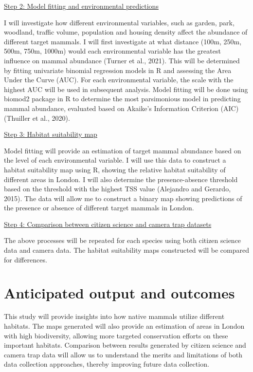 \documentclass[11pt, a4paper]{article}
\begin{document}
\underline{Step 2: Model fitting and environmental predictions}

I will investigate how different environmental variables, such as garden, park, woodland, traffic volume, population and housing density affect the abundance of different target mammals. I will first investigate at what distance (100m, 250m, 500m, 750m, 1000m) would each environmental variable has the greatest influence on mammal abundance (Turner et al., 2021). This will be determined by fitting univariate binomial regression models in R and assessing the Area Under the Curve (AUC). For each environmental variable, the scale with the highest AUC will be used in subsequent analysis. Model fitting will be done using biomod2 package in R to determine the most parsimonious model in predicting mammal abundance, evaluated based on Akaike’s Information Criterion (AIC) (Thuiller et al., 2020). 
\vspace{\baselineskip}

\underline{Step 3: Habitat suitability map} 

Model fitting will provide an estimation of target mammal abundance based on the level of each environmental variable. I will use this data to construct a habitat suitability map using R, showing the relative habitat suitability of different areas in London. I will also determine the presence-absence threshold based on the threshold with the highest TSS value (Alejandro and Gerardo, 2015). The data will allow me to construct a binary map showing predictions of the presence or absence of different target mammals in London. 
\vspace{\baselineskip}

\underline{Step 4: Comparison between citizen science and camera trap datasets} 

The above processes will be repeated for each species using both citizen science data and camera data. The habitat suitability maps constructed will be compared for differences. 

\section{Anticipated output and outcomes}

This study will provide insights into how native mammals utilize different habitats. The maps generated will also provide an estimation of areas in London with high biodiversity, allowing more targeted conservation efforts on these important habitats. Comparison between results generated by citizen science and camera trap data will allow us to understand the merits and limitations of both data collection approaches, thereby improving future data collection. 
\end{document}
